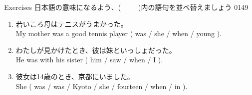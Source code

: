 \documentclass[aspectratio=169,xcolor={dvipsnames,table}]{beamer}
\begin{document}
\begin{frame}[plain]{Exercises}
日本語の意味になるよう、(~~~~~)内の語句を並べ替えましょう%
\mbox{}\hfill{\tiny 0149}\,{\scriptsize {}}

\begin{enumerate}
 \item 若いころ母はテニスがうまかった。\\
       My mother was a good tennis player ( was / she / when / young ).\\
 \item わたしが見かけたとき、彼は妹といっしょだった。\\
       He was with his sister ( him / saw / when / I ). \\
 \item  彼女は14歳のとき、京都にいました。\\
	She ( was / was / Kyoto / she / fourteen / when / in ).\\
\end{enumerate}
\end{frame}
\end{document}
